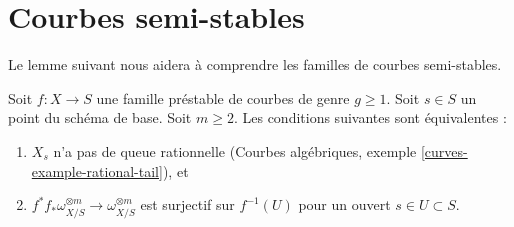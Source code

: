 \section{Courbes semi-stables}
\label{section-semistable-curves}

\noindent
Le lemme suivant nous aidera à comprendre les familles de courbes semi-stables.

\begin{lemma}
\label{lemma-semistable}
Soit $f : X \to S$ une famille préstable de courbes de genre $g \geq 1$.
Soit $s \in S$ un point du schéma de base. Soit $m \geq 2$.
Les conditions suivantes sont équivalentes :
\begin{enumerate}
\item $X_s$ n'a pas de queue rationnelle
(Courbes algébriques, exemple \ref{curves-example-rational-tail}), et
\item $f^*f_*\omega_{X/S}^{\otimes m} \to \omega_{X/S}^{\otimes m}$
est surjectif sur $f^{-1}(U)$ pour un ouvert $s \in U \subset S$.
\end{enumerate}
\end{lemma}

